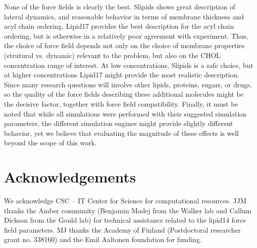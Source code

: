 \documentclass[aps,prl,superscriptaddress]{revtex4-2}
\begin{document}
None of the force fields is clearly the best. Slipids shows great description of lateral dynamics, and reasonable behavior in terms of membrane thickness and acyl chain ordering. Lipid17 provides the best description for the acyl chain ordering, but is otherwise in a relatively poor agreement with experiment. Thus, the choice of force field depends not only on the choice of membrane properties (strutural vs. dynamic) relevant to the problem, but also on the CHOL concentration range of interest. At low  concentrations, Slipids is a safe choice, but at higher concentrations Lipid17 might provide the most realistic description. Since many research questions will involve other lipids, proteins, sugars, or drugs, so the quality of the force fields describing these additional molecules might be the decisive factor, together with force field compatibility. Finally, it must be noted that while all simulations were performed with their suggested simulation parameters, the different simulation engines might provide slightly different behavior, yet we believe that evaluating the magnitude of these effects is well beyond the scope of this work.

\section{Acknowledgements}
We acknowledge CSC -- IT Center for Science for computational resources.
%
JJM thanks the Amber community (Benjamin Madej from the Walker lab and Callum Dickson from the Gould lab) for technical assistance related to the lipid14 force field parameters. 
%
MJ thanks the Academy of Finland (Postdoctoral researcher grant no. 338160) and the Emil Aaltonen foundation for funding.




\listoftodos
\end{document}
